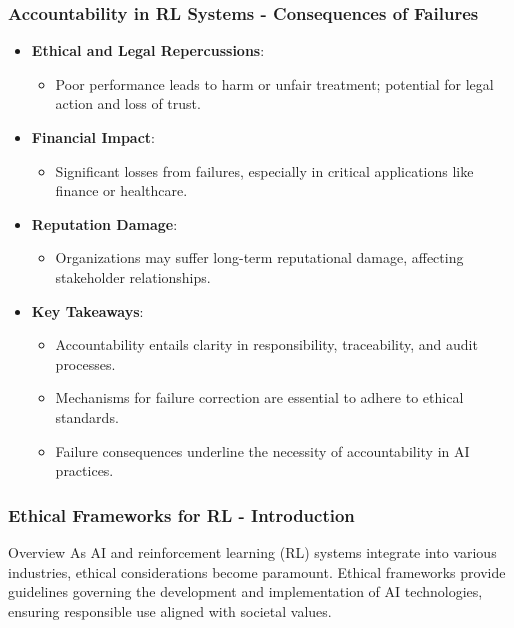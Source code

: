 \documentclass[aspectratio=169]{beamer}
\begin{document}
\begin{frame}[fragile]
    \frametitle{Accountability in RL Systems - Consequences of Failures}
    \begin{itemize}
        \item \textbf{Ethical and Legal Repercussions}:
        \begin{itemize}
            \item Poor performance leads to harm or unfair treatment; potential for legal action and loss of trust.
        \end{itemize}
        
        \item \textbf{Financial Impact}:
        \begin{itemize}
            \item Significant losses from failures, especially in critical applications like finance or healthcare.
        \end{itemize}
        
        \item \textbf{Reputation Damage}:
        \begin{itemize}
            \item Organizations may suffer long-term reputational damage, affecting stakeholder relationships.
        \end{itemize}
        
        \item \textbf{Key Takeaways}:
        \begin{itemize}
            \item Accountability entails clarity in responsibility, traceability, and audit processes.
            \item Mechanisms for failure correction are essential to adhere to ethical standards.
            \item Failure consequences underline the necessity of accountability in AI practices.
        \end{itemize}
    \end{itemize}
\end{frame}

\begin{frame}[fragile]
    \frametitle{Ethical Frameworks for RL - Introduction}
    \begin{block}{Overview}
        As AI and reinforcement learning (RL) systems integrate into various industries, ethical considerations become paramount. 
        Ethical frameworks provide guidelines governing the development and implementation of AI technologies, ensuring responsible use aligned with societal values.
    \end{block}
\end{frame}
\end{document}
